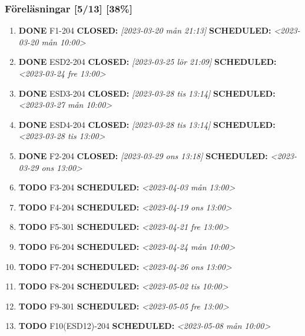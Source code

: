 \documentclass[11pt]{article}
\begin{document}
\subsubsection{Föreläsningar [5/13] [38\%]}
\label{sec:orgaf23ea7}
\begin{enumerate}
\item {\bfseries\sffamily DONE} F1-204
\label{sec:orgf3c5fa0}
\noindent\textbf{CLOSED:} \textit{[2023-03-20 mån 21:13] } \textbf{SCHEDULED:} \textit{<2023-03-20 mån 10:00>}\\[0pt]
\item {\bfseries\sffamily DONE} ESD2-204
\label{sec:org88c8dd1}
\noindent\textbf{CLOSED:} \textit{[2023-03-25 lör 21:09] } \textbf{SCHEDULED:} \textit{<2023-03-24 fre 13:00>}\\[0pt]
\item {\bfseries\sffamily DONE} ESD3-204
\label{sec:orgeedca48}
\noindent\textbf{CLOSED:} \textit{[2023-03-28 tis 13:14] } \textbf{SCHEDULED:} \textit{<2023-03-27 mån 10:00>}\\[0pt]
\item {\bfseries\sffamily DONE} ESD4-204
\label{sec:org852edf3}
\noindent\textbf{CLOSED:} \textit{[2023-03-28 tis 13:14] } \textbf{SCHEDULED:} \textit{<2023-03-28 tis 13:00>}\\[0pt]
\item {\bfseries\sffamily DONE} F2-204
\label{sec:org86ac8d1}
\noindent\textbf{CLOSED:} \textit{[2023-03-29 ons 13:18] } \textbf{SCHEDULED:} \textit{<2023-03-29 ons 13:00>}\\[0pt]
\item {\bfseries\sffamily TODO} F3-204
\label{sec:org9056358}
\noindent\textbf{SCHEDULED:} \textit{<2023-04-03 mån 13:00>}\\[0pt]
\item {\bfseries\sffamily TODO} F4-204
\label{sec:org030fe29}
\noindent\textbf{SCHEDULED:} \textit{<2023-04-19 ons 13:00>}\\[0pt]
\item {\bfseries\sffamily TODO} F5-301
\label{sec:orga735ed1}
\noindent\textbf{SCHEDULED:} \textit{<2023-04-21 fre 13:00>}\\[0pt]
\item {\bfseries\sffamily TODO} F6-204
\label{sec:org59b4886}
\noindent\textbf{SCHEDULED:} \textit{<2023-04-24 mån 10:00>}\\[0pt]
\item {\bfseries\sffamily TODO} F7-204
\label{sec:orgfa05acf}
\noindent\textbf{SCHEDULED:} \textit{<2023-04-26 ons 13:00>}\\[0pt]
\item {\bfseries\sffamily TODO} F8-204
\label{sec:org67a14db}
\noindent\textbf{SCHEDULED:} \textit{<2023-05-02 tis 10:00>}\\[0pt]
\item {\bfseries\sffamily TODO} F9-301
\label{sec:orgbc8f5f7}
\noindent\textbf{SCHEDULED:} \textit{<2023-05-05 fre 13:00>}\\[0pt]
\item {\bfseries\sffamily TODO} F10(ESD12)-204
\label{sec:org2475eb6}
\noindent\textbf{SCHEDULED:} \textit{<2023-05-08 mån 10:00>}\\[0pt]
\end{enumerate}
\end{document}
